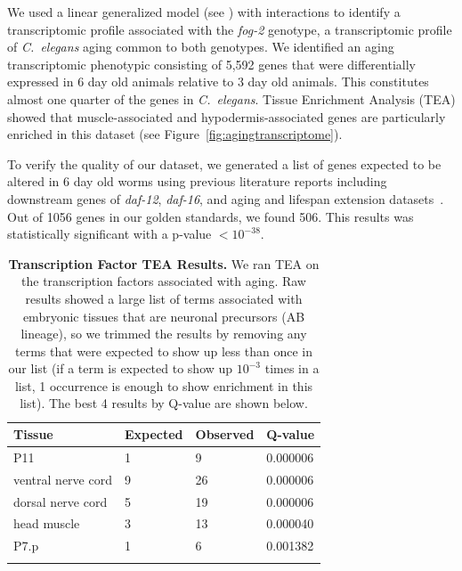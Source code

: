 \documentclass[9pt,twocolumn,twoside]{gsag3jnl}
\newcommand{\cel}{\emph{C.~elegans}}
\newcommand{\fog}{\emph{fog-2}}
\newcommand{\agen}{5,592}
\newcommand{\goldn}{1056}
\newcommand{\goldfound}{506}
\newcommand{\goldpval}{$<10^{-38}$}
\begin{document}
We used a linear generalized model (see ) with interactions to identify a transcriptomic profile associated with the \fog{} genotype, a transcriptomic profile of \cel{} aging common to both genotypes. We identified an aging transcriptomic phenotypic consisting of \agen{} genes that were differentially expressed in 6 day old animals relative to 3 day old animals. This constitutes almost one quarter of the genes in \cel{}. Tissue Enrichment Analysis (TEA) showed that muscle-associated and hypodermis-associated genes are particularly enriched in this dataset (see Figure~\ref{fig:agingtranscriptome}).

To verify the quality of our dataset, we generated a list of genes expected to be altered in 6 day old worms using previous literature reports including downstream genes of \emph{daf-12}, \emph{daf-16}, and aging and lifespan extension datasets~\citep{}. Out of \goldn{} genes in our golden standards, we found \goldfound{}. This results was statistically significant with a p-value \goldpval{}.

\begin{table}[htbp]
\renewcommand{\familydefault}{\sfdefault}\normalfont{}
\centering
\caption{\textbf{Transcription Factor TEA Results.} We ran TEA on the transcription factors associated with aging. Raw results showed a large list of terms associated with embryonic tissues that are neuronal precursors (AB lineage), so we trimmed the results by removing any terms that were expected to show up less than once in our list (if a term is expected to show up $10^{-3}$ times in a list, 1 occurrence is enough to show enrichment in this list). The best 4 results by Q-value are shown below.}
\begin{tableminipage}{\textwidth}
\begin{tabularx}{\textwidth}{XXXX}
\toprule
\header{}Tissue & Expected & Observed & Q-value \\
\bottomrule{}
P11	& 1 & 9 & 0.000006\\
ventral nerve cord &	9 &	26 &	0.000006\\
dorsal nerve cord &	5 &	19 & 0.000006\\
head muscle	& 3	& 13 &	0.000040\\
P7.p & 1 &	6	& 0.001382\\
\bottomrule{}
\end{tabularx}
\label{tab:tea_tf_age}
\end{tableminipage}
\end{table}
\end{document}
